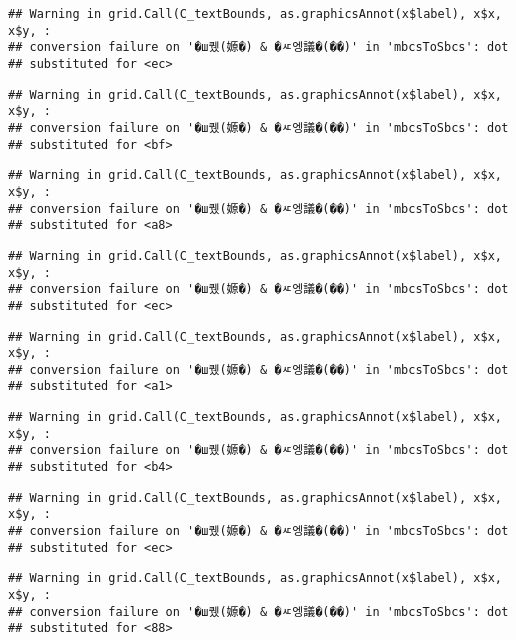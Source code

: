 \documentclass[
]{article}
\begin{document}
\begin{verbatim}
## Warning in grid.Call(C_textBounds, as.graphicsAnnot(x$label), x$x, x$y, :
## conversion failure on '�ш퀬(嫄�) & �ㅼ엥議�(��)' in 'mbcsToSbcs': dot
## substituted for <ec>
\end{verbatim}

\begin{verbatim}
## Warning in grid.Call(C_textBounds, as.graphicsAnnot(x$label), x$x, x$y, :
## conversion failure on '�ш퀬(嫄�) & �ㅼ엥議�(��)' in 'mbcsToSbcs': dot
## substituted for <bf>
\end{verbatim}

\begin{verbatim}
## Warning in grid.Call(C_textBounds, as.graphicsAnnot(x$label), x$x, x$y, :
## conversion failure on '�ш퀬(嫄�) & �ㅼ엥議�(��)' in 'mbcsToSbcs': dot
## substituted for <a8>
\end{verbatim}

\begin{verbatim}
## Warning in grid.Call(C_textBounds, as.graphicsAnnot(x$label), x$x, x$y, :
## conversion failure on '�ш퀬(嫄�) & �ㅼ엥議�(��)' in 'mbcsToSbcs': dot
## substituted for <ec>
\end{verbatim}

\begin{verbatim}
## Warning in grid.Call(C_textBounds, as.graphicsAnnot(x$label), x$x, x$y, :
## conversion failure on '�ш퀬(嫄�) & �ㅼ엥議�(��)' in 'mbcsToSbcs': dot
## substituted for <a1>
\end{verbatim}

\begin{verbatim}
## Warning in grid.Call(C_textBounds, as.graphicsAnnot(x$label), x$x, x$y, :
## conversion failure on '�ш퀬(嫄�) & �ㅼ엥議�(��)' in 'mbcsToSbcs': dot
## substituted for <b4>
\end{verbatim}

\begin{verbatim}
## Warning in grid.Call(C_textBounds, as.graphicsAnnot(x$label), x$x, x$y, :
## conversion failure on '�ш퀬(嫄�) & �ㅼ엥議�(��)' in 'mbcsToSbcs': dot
## substituted for <ec>
\end{verbatim}

\begin{verbatim}
## Warning in grid.Call(C_textBounds, as.graphicsAnnot(x$label), x$x, x$y, :
## conversion failure on '�ш퀬(嫄�) & �ㅼ엥議�(��)' in 'mbcsToSbcs': dot
## substituted for <88>
\end{verbatim}
\end{document}
